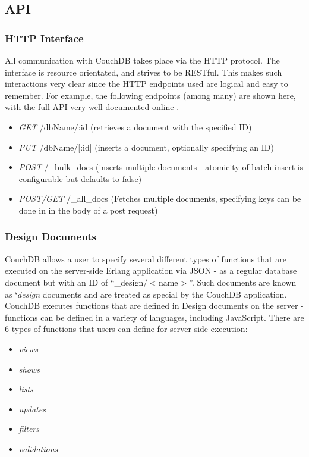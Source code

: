 \subsection{API}
\subsubsection{HTTP Interface}
All communication with CouchDB takes place via the HTTP protocol. The interface is resource orientated, and strives to be RESTful. This makes such interactions very clear since the HTTP endpoints used are logical and easy to remember. For example, the following endpoints (among many) are shown here, with the full API very well documented online \cite{couch-api}.

\begin{itemize}
    \item \textit{GET} /dbName/:id (retrieves a document with the specified ID)
    \item \textit{PUT} /dbName/[:id] (inserts a document, optionally specifying an ID)
    \item \textit{POST} /\_bulk\_docs (inserts multiple documents - atomicity of batch insert is configurable but defaults to false)
    \item \textit{POST/GET} /\_all\_docs (Fetches multiple documents, specifying keys can be done in in the body of a post request)
\end{itemize}

\subsubsection{Design Documents}
CouchDB allows a user to specify several different types of functions that are executed on the server-side Erlang application via JSON - as a regular database document but with an ID of ``\_design/$<$name$>$''. Such documents are known as `\textit{design} documents and are treated as special by the CouchDB application. CouchDB executes functions that are defined in Design documents on the server - functions can be defined in a variety of languages, including JavaScript. There are 6 types of functions that users can define for server-side execution:

\begin{itemize}
    \item \textit{views}
    \item \textit{shows}
    \item \textit{lists}
    \item \textit{updates}
    \item \textit{filters}
    \item \textit{validations}
\end{itemize}

